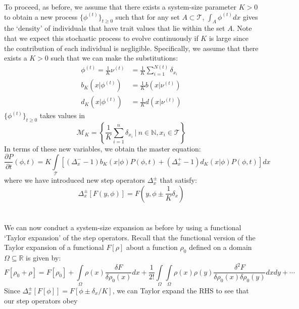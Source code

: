 To proceed, as before, we assume that there exists a system-size parameter $K > 0$ to obtain a new process $\{\phi^{(t)}\}_{t \geq 0}$ such that for any set $A \subset \mathcal{T}$, $\int_A\phi^{(t)}dx$ gives the `density' of individuals that have trait values that lie within the set $A$. Note that we expect this stochastic process to evolve continuously if $K$ is large since the contribution of each individual is negligible. Specifically, we assume that there exists a $K>0$ such that we can make the substitutions:
\begin{align*}
    \phi^{(t)} = \frac{1}{K}\nu^{(t)} &= \frac{1}{K}\sum\limits_{i=1}^{N(t)}\delta_{x_i}\\
    b_K(x|\phi^{(t)}) &= \frac{1}{K}b(x|\nu^{(t)})\\
    d_K(x|\phi^{(t)}) &= \frac{1}{K}d(x|\nu^{(t)})
\end{align*}
$\{\phi^{(t)}\}_{t\geq0}$ takes values in 
\begin{equation*}
    \mathcal{M}_K = \left\{\frac{1}{K}\sum\limits_{i=1}^{n}\delta_{x_i} \ | \ n \in \mathbb{N}, x_i \in \mathcal{T}\right\}
\end{equation*}
In terms of these new variables, we obtain the master equation:
\begin{equation}
\label{M_equation}
    \frac{\partial P}{\partial t}(\phi,t) = K\int\limits_{\mathcal{T}}\left[(\Delta^{-}_{x}-1)b_K(x|\phi)P(\phi,t) +(\Delta^{+}_{x}-1)d_K(x|\phi)P(\phi,t)\right]dx
\end{equation}
where we have introduced new step operators $\Delta_{x}^{\pm}$ that satisfy:
\begin{equation*}
    \Delta_{x}^{\pm}[F(y,\phi)] =  F\left(y,\phi \pm \frac{1}{K}\delta_x\right)
\end{equation*}
\\
\\
We can now conduct a system-size expansion as before by using a functional `Taylor expansion' of the step operators. Recall that the functional version of the Taylor expansion of a functional $F[\rho]$ about a function $\rho_0$ defined on a domain $\Omega \subseteq \mathbb{R}$ is given by:
\begin{equation*}
    F[\rho_0 + \rho] = F[\rho_0] + \int\limits_{\Omega}\rho(x)\frac{\delta F}{\delta \rho_0(x)}dx + \frac{1}{2!}\int\limits_{\Omega}\int\limits_{\Omega}\rho(x)\rho(y)\frac{\delta^2 F}{\delta \rho_0(x)\delta \rho_0(y)}dxdy + \cdots
\end{equation*}
Since $\Delta^{\pm}_{x}[F[\phi]] = F[\phi \pm \delta_x/K]$, we can Taylor expand the RHS to see that our step operators obey
